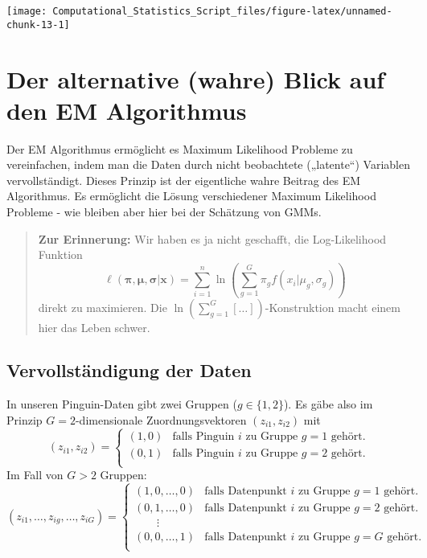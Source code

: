\documentclass[
  ngerman,
]{book}
\begin{document}
\begin{center}\texttt{[image: Computational\_Statistics\_Script\_files/figure-latex/unnamed-chunk-13-1]} \end{center}

\hypertarget{der-alternative-wahre-blick-auf-den-em-algorithmus}{%
\section{Der alternative (wahre) Blick auf den EM Algorithmus}\label{der-alternative-wahre-blick-auf-den-em-algorithmus}}

Der EM Algorithmus ermöglicht es Maximum Likelihood Probleme zu vereinfachen, indem man die Daten durch nicht beobachtete („latente``) Variablen vervollständigt. Dieses Prinzip ist der eigentliche wahre Beitrag des EM Algorithmus. Es ermöglicht die Lösung verschiedener Maximum Likelihood Probleme - wie bleiben aber hier bei der Schätzung von GMMs.

\begin{quote}
\textbf{Zur Erinnerung:} Wir haben es ja nicht geschafft, die Log-Likelihood Funktion
\[
\ell(\boldsymbol{\pi},\boldsymbol{\mu},\boldsymbol{\sigma}|\mathbf{x})
=\sum_{i=1}^n\ln\left(\sum_{g=1}^G\pi_gf(x_i|\mu_g,\sigma_g)\right)
\]
direkt zu maximieren. Die \(\ln(\sum_{g=1}^G[\dots])\)-Konstruktion macht einem hier das Leben schwer.
\end{quote}

\hypertarget{vervollstuxe4ndigung-der-daten}{%
\subsection{Vervollständigung der Daten}\label{vervollstuxe4ndigung-der-daten}}

In unseren Pinguin-Daten gibt zwei Gruppen (\(g\in\{1,2\}\)). Es gäbe also im Prinzip \(G=2\)-dimensionale Zuordnungsvektoren \((z_{i1},z_{i2})\) mit
\[
(z_{i1},z_{i2})=
\left\{\begin{array}{ll}
(1,0)&\text{falls Pinguin }i\text{ zu Gruppe }g=1\text{ gehört.}\\
(0,1)&\text{falls Pinguin }i\text{ zu Gruppe }g=2\text{ gehört.}\\
\end{array}\right.
\]
Im Fall von \(G>2\) Gruppen:\\
\[
(z_{i1},\dots,z_{ig},\dots,z_{iG})=
\left\{\begin{array}{ll}
(1,0,\dots,0)&\text{falls Datenpunkt }i\text{ zu Gruppe }g=1\text{ gehört.}\\
(0,1,\dots,0)&\text{falls Datenpunkt }i\text{ zu Gruppe }g=2\text{ gehört.}\\
\quad\quad\vdots&\\
(0,0,\dots,1)&\text{falls Datenpunkt }i\text{ zu Gruppe }g=G\text{ gehört.}\\
\end{array}\right.
\]
\end{document}
